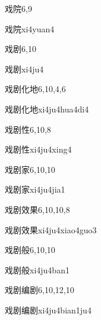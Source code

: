 \begin{entry}{戏院}{6,9}
  \begin{phonetics}{戏院}{xi4yuan4}
  \end{phonetics}
\end{entry}

\begin{entry}{戏剧}{6,10}
  \begin{phonetics}{戏剧}{xi4ju4}
  \end{phonetics}
\end{entry}

\begin{entry}{戏剧化地}{6,10,4,6}
  \begin{phonetics}{戏剧化地}{xi4ju4hua4di4}
  \end{phonetics}
\end{entry}

\begin{entry}{戏剧性}{6,10,8}
  \begin{phonetics}{戏剧性}{xi4ju4xing4}
  \end{phonetics}
\end{entry}

\begin{entry}{戏剧家}{6,10,10}
  \begin{phonetics}{戏剧家}{xi4ju4jia1}
  \end{phonetics}
\end{entry}

\begin{entry}{戏剧效果}{6,10,10,8}
  \begin{phonetics}{戏剧效果}{xi4ju4xiao4guo3}
  \end{phonetics}
\end{entry}

\begin{entry}{戏剧般}{6,10,10}
  \begin{phonetics}{戏剧般}{xi4ju4ban1}
  \end{phonetics}
\end{entry}

\begin{entry}{戏剧编剧}{6,10,12,10}
  \begin{phonetics}{戏剧编剧}{xi4ju4bian1ju4}
  \end{phonetics}
\end{entry}

